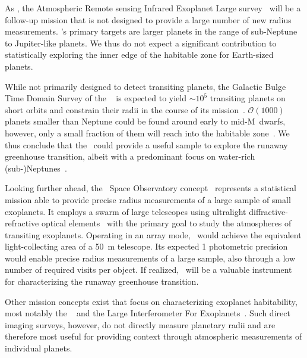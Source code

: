 \documentclass[twocolumn,twocolappendix]{aastex631}
\begin{document}
As \cheops, the Atmospheric Remote sensing Infrared Exoplanet Large survey~\citep[\ariel,][]{Puig2016} will be a follow-up mission that is not designed to provide a large number of new radius measurements.
\ariel's primary targets are larger planets in the range of sub-Neptune to Jupiter-like planets.
We thus do not expect a significant contribution to statistically exploring the inner edge of the habitable zone for Earth-sized planets.

While not primarily designed to detect transiting planets, the Galactic Bulge Time Domain Survey of the \rst~\citep{Spergel2015} is expected to yield $\sim 10^5$ transiting planets on short orbits and constrain their radii in the course of its mission~\citep{Montet2017}.
$\mathcal{O} (1000)$ planets smaller than Neptune could be found around early to mid-M~dwarfs, however, only a small fraction of them will reach into the habitable zone~\citep{Tamburo2023}.
We thus conclude that the \rst\ could provide a useful sample to explore the runaway greenhouse transition, albeit with a predominant focus on water-rich (sub-)Neptunes~\citep[e.g.,][]{Pierrehumbert2022}.

Looking further ahead, the \nautilus\ Space Observatory concept~\citep{Apai2019} represents a statistical mission able to provide precise radius measurements of a large sample of small exoplanets.
It employs a swarm of large telescopes using ultralight diffractive-refractive optical elements~\citep{Milster2020} with the primary goal to study the atmospheres of transiting exoplanets.
Operating in an array mode, \nautilus\ would achieve the equivalent light-collecting area of a \SI{50}{\meter} telescope.
Its expected \SI{1}{\ppm} photometric precision~\citep{Apai2022} would enable precise radius measurements of a large sample, also through a low number of required visits per object.
If realized, \nautilus\ will be a valuable instrument for characterizing the runaway greenhouse transition.

Other mission concepts exist that focus on characterizing exoplanet habitability, most notably the \hwo~\citep{Gaudi2020c,LUVOIR2019} and the Large Interferometer For Exoplanets~\citep[\life,][]{Quanz2021}.
Such direct imaging surveys, however, do not directly measure planetary radii and are therefore most useful for providing context through atmospheric measurements of individual planets. 
\end{document}

